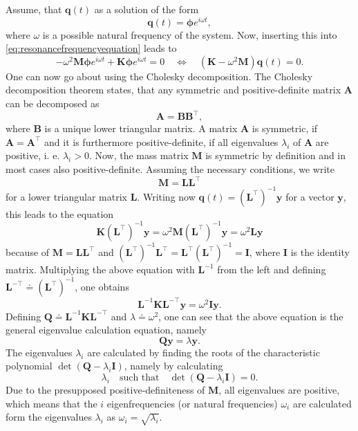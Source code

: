 \documentclass[a4paper,11pt]{article}
\numberwithin{equation}{section}
\newcommand\matr[1]{\ensuremath{\boldsymbol{\mathbf{#1}}}}
\newcommand\vect[1]{\ensuremath{\bm{#1}}}
\begin{document}
{Assume, that $\vect{q}(t)$ as a solution of the form \begin{equation}
	\vect{q}(t) = \vect{\phi}e^{i\omega t},
\end{equation} where $\omega$ is a possible natural frequency of the system. Now, inserting this into \cref{eq:resonancefrequencyequation} leads to \begin{equation}
-\omega^2 \matr{M}\vect{\phi}e^{i\omega t} + \matr{K}\vect{\phi}e^{i\omega t} = 0 \quad \Leftrightarrow \quad \left(\matr{K}-\omega^2\matr{M}\right)\vect{q}(t) = 0.
\end{equation} One can now go about using the Cholesky decomposition. The Cholesky decomposition theorem states, that any symmetric and positive-definite matrix $\matr{A}$ can be decomposed as \begin{equation}
\matr{A} = \matr{B}\matr{B}^\top,
\end{equation} where $\matr{B}$ is a unique lower triangular matrix. A matrix $\matr{A}$ is symmetric, if $\matr{A} = \matr{A}^\top$ and it is furthermore positive-definite, if all eigenvalues $\lambda_i$ of $\matr{A}$ are positive, i. e. $\lambda_i > 0$. Now, the mass matrix $\matr{M}$ is symmetric by definition and in most cases also positive-definite. Assuming the necessary conditions, we write \begin{equation}
\matr{M} = \matr{L}\matr{L}^\top
\end{equation} for a lower triangular matrix $\matr{L}$. Writing now $\vect{q}(t) = (\vect{L}^\top)^{-1} \vect{y}$ for a vector $\vect{y}$, this leads to the equation \begin{equation}
\matr{K}(\vect{L}^\top)^{-1} \vect{y} = \omega^2\matr{M}(\vect{L}^\top)^{-1} \vect{y} = \omega^2 \matr{L}\vect{y}
\end{equation} because of $\matr{M} = \matr{L}\matr{L}^\top$ and $(\matr{L}^\top)^{-1}\matr{L}^\top = \matr{L}^\top(\matr{L}^\top)^{-1} = \matr{I}$, where $\matr{I}$ is the identity matrix. Multiplying the above equation with $\matr{L}^{-1}$ from the left and defining $\matr{L}^{-\top} \doteq (\matr{L}^\top)^{-1}$, one obtains \begin{equation}
\matr{L}^{-1}\matr{K}\matr{L}^{-\top} \vect{y} = \omega^2 \matr{I} \vect{y}.
\end{equation} Defining $\matr{Q} \doteq \matr{L}^{-1}\matr{K}\matr{L}^{-\top} $ and $\lambda \doteq \omega^2$, one can see that the above equation is the general eigenvalue calculation equation, namely \begin{equation}
\matr{Q}\vect{y} = \lambda \vect{y}.
\end{equation} The eigenvalues $\lambda_i$ are calculated by finding the roots of the characteristic polynomial $\det(\matr{Q}-\lambda_i \matr{I})$, namely by calculating \begin{equation}
\lambda_i \quad \text{such that} \quad \det(\matr{Q}-\lambda_i \matr{I}) = 0.
\end{equation} Due to the presupposed positive-definiteness of $\matr{M}$, all eigenvalues are positive, which means that the $i$ eigenfrequencies (or natural frequencies) $\omega_i$ are calculated form the eigenvalues $\lambda_i$ as $\omega_i = \sqrt{\lambda_i}$.
}
\end{document}
